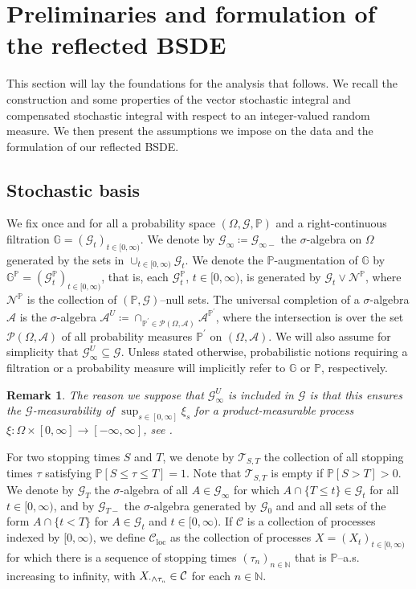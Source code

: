 \documentclass[10pt]{article} %
\newtheorem{remark}[theorem]{Remark}
\newcommand\cA{\mathcal A}
\newcommand\cC{\mathcal C}
\newcommand\cG{\mathcal G}
\newcommand\cN{\mathcal N}
\newcommand\cT{\mathcal T}
\newcommand{\smalltext}[1]{\text{\fontsize{4}{4}\selectfont$#1$}}
\def \G{\mathbb{G}}
\def \N{\mathbb{N}}
\def \P{\mathbb{P}}
\def\Ac{\mathcal{A}}
\def\Pc{\mathcal{P}}
\newcommand{\1}{\mathbf{1}}
\begin{document}
\section{Preliminaries and formulation of the reflected BSDE}\label{sec::preliminaries}

This section will lay the foundations for the analysis that follows. We recall the construction and some properties of the vector stochastic integral and compensated stochastic integral with respect to an integer-valued random measure. We then present the assumptions we impose on the data and the formulation of our reflected BSDE.

\subsection{Stochastic basis}\label{sec::stochastic_basis}

We fix once and for all a probability space $(\Omega,\cG,\P)$ and a right-continuous filtration $\G = (\cG_t)_{t \in [0,\infty)}$. We denote by $\cG_\infty \coloneqq \cG_{\infty-}$ the $\sigma$-algebra on $\Omega$ generated by the sets in $\cup_{t \in [0,\infty)} \cG_t$. We denote the $\P$-augmentation of $\G$ by $\G^\P = (\cG^\P_t)_{t \in [0,\infty)}$, that is, each $\cG^\P_t$, $t \in [0,\infty)$, is generated by $\cG_t \lor \cN^\P$, where $\cN^\P$ is the collection of $(\P,\cG)$--null sets. The universal completion of a $\sigma$-algebra $\cA$ is the $\sigma$-algebra $\cA^U \coloneqq \cap_{\P^\prime\in\Pc(\Omega,\Ac)} \cA^{\P^\prime}$, where the intersection is over the set $\Pc(\Omega,\Ac)$ of all probability measures $\P^\prime$ on $(\Omega,\cA)$. We will also assume for simplicity that $\cG^U_\infty \subseteq \cG$. Unless stated otherwise, probabilistic notions requiring a filtration or a probability measure will implicitly refer to $\G$ or $\P$, respectively. 

\begin{remark}\label{rem::measurability_of_sup}
	The reason we suppose that $\cG^U_\infty$ is included in $\cG$ is that this ensures the $\cG$-measurability of $\sup_{s \in [0,\infty]} \xi_s$ for a product-measurable process $\xi : \Omega \times [0,\infty] \longrightarrow [-\infty,\infty]$, see {\rm\cite[Proposition 2.21]{karoui2013capacities}}.
\end{remark}

For two stopping times $S$ and $T$, we denote by $\cT_{S,T}$ the collection of all stopping times $\tau$ satisfying $\P[S \leq \tau \leq T] = 1$. Note that $\cT_{S,T}$ is empty if $\P[S > T] > 0$. We denote by $\cG_T$ the $\sigma$-algebra of all $A \in \cG_\infty$ for which $A \cap \{T \leq t\} \in \cG_t$ for all $t \in [0,\infty)$, and by $\cG_{T-}$ the $\sigma$-algebra generated by $\cG_0$ and and all sets of the form $A \cap \{t < T\}$ for $A \in \cG_t$ and $t \in [0,\infty)$.  If $\cC$ is a collection of processes indexed by $[0,\infty)$, we define $\cC_\mathrm{loc}$ as the collection of processes $X = (X_t)_{t \in [0,\infty)}$ for which there is a sequence of stopping times $(\tau_n)_{n \in \N}$ that is $\P$--a.s. increasing to infinity, with $X_{\cdot \land \tau_\smalltext{n}} \in \cC$ for each $n \in \N$.
\end{document}
